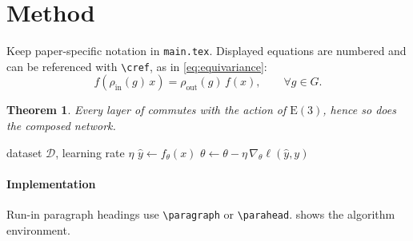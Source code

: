 \section{Method}
\label{sec:method}

Keep paper-specific notation in \texttt{main.tex}. Displayed equations are numbered and can be referenced with \verb|\cref|, as in \cref{eq:equivariance}:
\begin{equation}
  f(\rho_{\mathrm{in}}(g)\,x) = \rho_{\mathrm{out}}(g)\,f(x), \qquad \forall g \in G.
  \label{eq:equivariance}
\end{equation}

\newtheorem{theorem}{Theorem}
\begin{theorem}\label{thm:main}
Every layer of \method commutes with the action of $\mathrm{E}(3)$, hence so does the composed network.
\end{theorem}

\begin{algorithm}[t]
  \caption{Training loop of \method}\label{alg:train}
  \begin{algorithmic}[1]
    \Require dataset $\mathcal{D}$, learning rate $\eta$
      \State $\hat{y} \gets f_\theta(x)$
      \State $\theta \gets \theta - \eta\,\nabla_\theta \ell(\hat{y}, y)$
    \EndFor
  \end{algorithmic}
\end{algorithm}

\paragraph{Implementation} Run-in paragraph headings use \verb|\paragraph| or \verb|\parahead|.  shows the algorithm environment.
